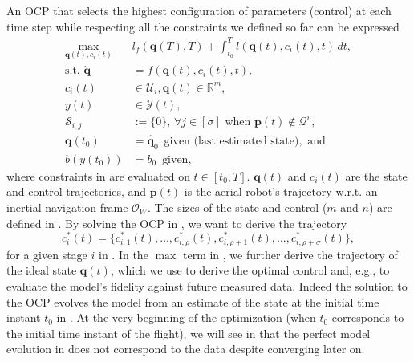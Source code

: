An OCP that selects the highest configuration of parameters (control) at each time step while respecting all the constraints we defined so far can be expressed
\begin{subequations}\label{eq:ocp-output-mpc}\begin{align}
  \max_{\mathbf{q}(t),c_i(t)}&{l_f(\mathbf{q}(T),T)+\int_{t_0}^T{l(\mathbf{q}(t),c_i(t),t)\,dt}},\\
  \text{s.t. }\dot{\mathbf{q}}&=f(\mathbf{q}(t),c_i(t),t),\label{eq:dyn-evol}\\
  c_i(t)&\in\mathcal{U}_i,\mathbf{q}(t)\in\mathbb{R}^m,\label{eq:state-cont-const-mpc}\\
  y(t)&\in\mathcal{Y}(t),\label{eq:batt-const-mpc}\\
  \mathcal{S}_{i,j}&:=\{0\},\,\forall j \in [\sigma]\text{ when }\mathbf{p}(t)\notin\mathcal{Q}^v,\label{eq:polyg-const}\\
  \mathbf{q}(t_0)&=\hat{\mathbf{q}}_0\,\,\,\text{given (last estimated state)},\text{ and}\label{eq:ocp-outp-mpc-state-est}\\
  b(y(t_0))&=b_0\,\,\,\text{given},
\end{align}\end{subequations}
where constraints in  are evaluated on $t\in[t_0,T]$. $\mathbf{q}(t)$ and $c_i(t)$ are the state and control trajectories, and $\mathbf{p}(t)$ is the aerial robot's trajectory w.r.t. an inertial navigation frame $\mathcal{O}_W$. The sizes of the state and control ($m$ and $n$) are defined in . By solving the OCP in , we want to derive the trajectory 
\begin{equation}\label{eq:opti-conf-mpc}
  c_i^*(t)=\{c^*_{i,1}(t),\dots,c^*_{i,\rho}(t),c^*_{i,\rho+1}(t),\dots,c^*_{i,\rho+\sigma}(t)\},
\end{equation}
for a given stage $i$ in . In the $\max$ term in , we further derive the trajectory of the ideal state $\mathbf{q}(t)$, which we use to derive the optimal control and, e.g., to evaluate the model's fidelity against future measured data. Indeed the solution to the OCP evolves the model from an estimate of the state at the initial time instant $t_0$ in . At the very beginning of the optimization (when $t_0$ corresponds to the initial time instant of the flight), we will see in  that the perfect model evolution in  does not correspond to the data despite converging later on.
